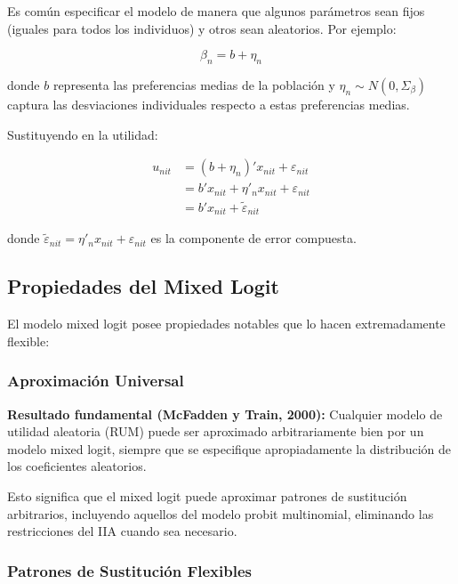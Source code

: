 \documentclass[
]{book}
\begin{document}
Es común especificar el modelo de manera que algunos parámetros sean fijos (iguales para todos los individuos) y otros sean aleatorios. Por ejemplo:

\begin{equation}
\beta_n = b + \eta_n
\label{eq:betadecomp}
\end{equation}

donde \(b\) representa las preferencias medias de la población y \(\eta_n \sim N(0, \Sigma_\beta)\) captura las desviaciones individuales respecto a estas preferencias medias.

Sustituyendo en la utilidad:

\[
\begin{aligned}
u_{nit} &= (b + \eta_n)' x_{nit} + \varepsilon_{nit}\\
&= b' x_{nit} + \eta'_n x_{nit} + \varepsilon_{nit}\\
&= b' x_{nit} + \tilde{\varepsilon}_{nit}
\end{aligned}
\]

donde \(\tilde{\varepsilon}_{nit} = \eta'_n x_{nit} + \varepsilon_{nit}\) es la componente de error compuesta.

\subsection{Propiedades del Mixed Logit}\label{propiedades-del-mixed-logit}

El modelo mixed logit posee propiedades notables que lo hacen extremadamente flexible:

\subsubsection{Aproximación Universal}\label{aproximaciuxf3n-universal}

\textbf{Resultado fundamental (McFadden y Train, 2000):} Cualquier modelo de utilidad aleatoria (RUM) puede ser aproximado arbitrariamente bien por un modelo mixed logit, siempre que se especifique apropiadamente la distribución de los coeficientes aleatorios.

Esto significa que el mixed logit puede aproximar patrones de sustitución arbitrarios, incluyendo aquellos del modelo probit multinomial, eliminando las restricciones del IIA cuando sea necesario.

\subsubsection{Patrones de Sustitución Flexibles}\label{patrones-de-sustituciuxf3n-flexibles}
\end{document}
